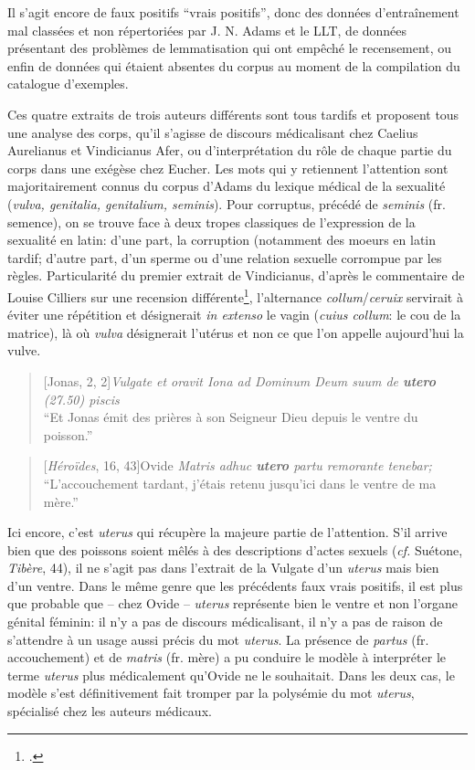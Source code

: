 Il s'agit encore de faux positifs ``vrais positifs'', donc des données d'entraînement mal classées et non répertoriées par J. N. Adams et le LLT, de données présentant des problèmes de lemmatisation qui ont empêché le recensement, ou enfin de données qui étaient absentes du corpus au moment de la compilation du catalogue d'exemples.

Ces quatre extraits de trois auteurs différents sont tous tardifs et proposent tous une analyse des corps, qu'il s'agisse de discours médicalisant chez Caelius Aurelianus et Vindicianus Afer, ou d'interprétation du rôle de chaque partie du corps dans une exégèse chez Eucher. Les mots qui y retiennent l'attention sont majoritairement connus du corpus d'Adams du lexique médical de la sexualité (\textit{vulva, genitalia, genitalium, seminis}). Pour {corruptus}, précédé de \textit{seminis} (fr. semence), on se trouve face à deux tropes classiques de l'expression de la sexualité en latin: d'une part, la corruption (notamment des moeurs en latin tardif; d'autre part, d'un sperme ou d'une relation sexuelle corrompue par les règles. Particularité du premier extrait de Vindicianus, d'après le commentaire de Louise Cilliers sur une recension différente\footcite[p.236]{cilliers_vindicianuss_2005}, l'alternance \textit{collum}/\textit{ceruix} servirait à éviter une répétition et désignerait \textit{in extenso} le vagin (\textit{cuius collum}: le cou de la matrice), là où \textit{vulva} désignerait l'utérus et non ce que l'on appelle aujourd'hui la vulve.

\begin{quote}[Jonas, 2, 2]{\textit{Vulgate}}
    \textit{et oravit Iona ad Dominum Deum suum de \textbf{utero} (27.50) piscis} \\
    \enquote{Et Jonas émit des prières à son Seigneur Dieu depuis le ventre du poisson.}
\end{quote}

\begin{quote}[\textit{Héroïdes}, 16, 43]{Ovide}
    \textit{Matris adhuc \textbf{utero} partu remorante tenebar;} \\
    \enquote{L'accouchement tardant, j'étais retenu jusqu'ici dans le ventre de ma mère.}
\end{quote} 

Ici encore, c'est \textit{uterus} qui récupère la majeure partie de l'attention. S'il arrive bien que des poissons soient mêlés à des descriptions d'actes sexuels (\textit{cf.} Suétone, \textit{Tibère}, 44), il ne s'agit pas dans l'extrait de la Vulgate d'un \textit{uterus} mais bien d'un ventre. Dans le même genre que les précédents faux vrais positifs, il est plus que probable que -- chez Ovide -- \textit{uterus} représente bien le ventre et non l'organe génital féminin: il n'y a pas de discours médicalisant, il n'y a pas de raison de s'attendre à un usage aussi précis du mot \textit{uterus}. La présence de \textit{partus} (fr. accouchement) et de \textit{matris} (fr. mère) a pu conduire le modèle à interpréter le terme \textit{uterus} plus médicalement qu'Ovide ne le souhaitait. Dans les deux cas, le modèle s'est définitivement fait tromper par la polysémie du mot \textit{uterus}, spécialisé chez les auteurs médicaux.

